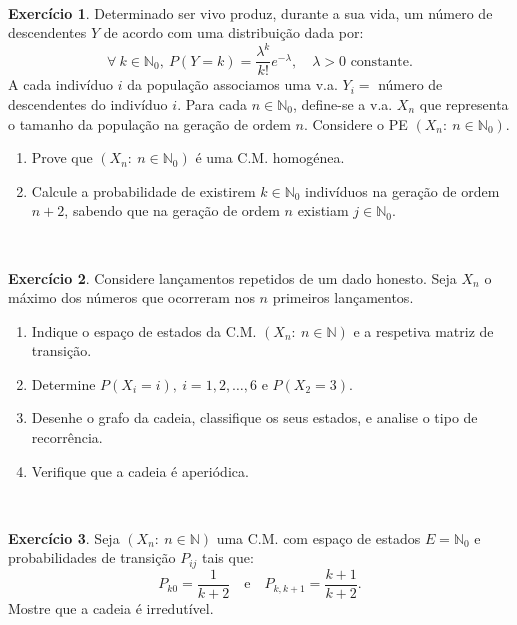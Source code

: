 \documentclass[
  11pt,
  a4paper,
]{book}
\theoremstyle{definition}
\theoremstyle{definition}
\theoremstyle{definition}
\newtheorem{exercise}{Exercício}[chapter]
\theoremstyle{definition}
\theoremstyle{remark}
\begin{document}
\(\,\)

\begin{exercise}

Determinado ser vivo produz, durante a sua vida, um número de descendentes \(Y\) de acordo com uma distribuição dada por:
\[\forall ~k \in \mathbb{N}_0, ~P(Y=k)=\dfrac{\lambda^k}{k!}e^{-\lambda}, \quad \lambda >0 \text{ constante}.\]
A cada indivíduo \(i\) da população associamos uma v.a. \(Y_i=\) número de descendentes do indivíduo \(i\). Para cada \(n \in \mathbb{N}_0\), define-se a v.a. \(X_n\) que representa o tamanho da população na geração de ordem \(n\). Considere o PE \((X_n: ~n \in \mathbb{N}_0)\).

\begin{enumerate}
\def\labelenumi{(\alph{enumi})}
\item
  Prove que \((X_n: ~n \in \mathbb{N}_0)\) é uma C.M. homogénea.
\item
  Calcule a probabilidade de existirem \(k \in \mathbb{N}_0\) indivíduos na geração de ordem \(n+2\), sabendo que na geração de ordem \(n\) existiam \(j \in \mathbb{N}_0\).
\end{enumerate}

\end{exercise}

\(\,\)

\begin{exercise}

Considere lançamentos repetidos de um dado honesto. Seja \(X_n\) o máximo dos números que ocorreram nos \(n\) primeiros lançamentos.

\begin{enumerate}
\def\labelenumi{(\alph{enumi})}
\item
  Indique o espaço de estados da C.M. \((X_n: ~n \in \mathbb{N})\) e a respetiva matriz de transição.
\item
  Determine \(P(X_i=i), ~i=1,2,\dots,6\) e \(P(X_2=3)\).
\item
  Desenhe o grafo da cadeia, classifique os seus estados, e analise o tipo de recorrência.
\item
  Verifique que a cadeia é aperiódica.
\end{enumerate}

\end{exercise}

\(\,\)

\begin{exercise}
Seja \((X_n: ~n \in \mathbb{N})\) uma C.M. com espaço de estados \(E=\mathbb{N}_0\) e probabilidades de transição \(P_{ij}\) tais que:
\[P_{k0}=\dfrac{1}{k+2} \quad \text{e} \quad P_{k,k+1}=\dfrac{k+1}{k+2}.\]
Mostre que a cadeia é irredutível.
\end{exercise}
\end{document}

